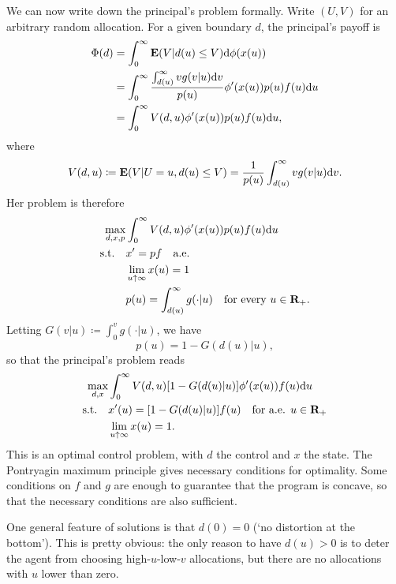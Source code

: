We can now write down the principal's problem formally.
Write $(U,V)$ for an arbitrary random allocation.
For a given boundary $d$, the principal's payoff is
%
\begin{align*}
	\Phi(d)
	&= \int_0^\infty
	\E\left( V \middle| d(u) \leq V \right)
	\dd \phi(x(u))
	\\
	&= \int_0^\infty
	\frac{ \int_{d(u)}^\infty v g(v|u) \dd v }{ p(u) }
	\phi'(x(u)) p(u) f(u) \dd u
	\\
	&= \int_0^\infty V(d,u) \phi'(x(u)) p(u) f(u) \dd u ,
\end{align*}
%
where
%
\begin{equation*}
	V(d,u) 
	\coloneqq \E\left( V \middle| U=u, d(u) \leq V \right) 
	= \frac{1}{p(u)} \int_{d(u)}^\infty v g(v|u) \dd v .
\end{equation*}
%
Her problem is therefore
%
\begin{align*}
	\max_{ d,x,p }
	& \int_0^\infty V(d,u) \phi'(x(u)) p(u) f(u) \mathrm{d} u
	\\
	\text{s.t.}\quad
	& x' = p f
	\quad \text{a.e.}
	\\
	& \lim_{u \uparrow \infty} x(u) = 1
	\\
	& p(u) = \int_{d(u)}^\infty g(\cdot|u) 
	\quad \text{for every $u \in \mathbf{R}_+$.}
\end{align*}
%
Letting $G(v|u) \coloneqq \int_0^v g(\cdot|u)$, we have
%
\begin{equation*}
	p(u) = 1 - G(d(u)|u) ,
\end{equation*}
%
so that the principal's problem reads
%
\begin{align*}
	\max_{ d, x }
	& \int_0^\infty 
	V(d,u)
	\left[ 1 - G(d(u)|u) \right]
	\phi'(x(u)) f(u)
	\dd u
	\\
	\text{s.t.}\quad
	& x'(u) = \left[ 1 - G(d(u)|u) \right] f(u)
	\quad \text{for a.e. $u \in \R_+$}
	\\
	& \lim_{u \uparrow \infty} x(u) = 1 .
\end{align*}
%
This is an optimal control problem,
with $d$ the control and $x$ the state. The Pontryagin maximum principle gives necessary conditions for optimality. Some conditions on $f$ and $g$ are enough to guarantee that the program is concave, so that the necessary conditions are also sufficient.

One general feature of solutions is that $d(0)=0$ (`no distortion at the bottom'). This is pretty obvious: the only reason to have $d(u) > 0$ is to deter the agent from choosing high-$u$-low-$v$ allocations, but there are no allocations with $u$ lower than zero.

